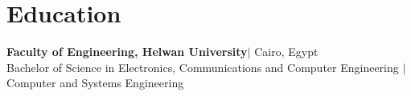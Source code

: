 \section{Education}
  \begin{itemize}[leftmargin=0.15in, label={}]
    {\item{
      \textbf{Faculty of Engineering, Helwan University}{$|$ Cairo, Egypt} \\
      Bachelor of Science in Electronics, Communications and Computer Engineering $|$ Computer and Systems Engineering
    }}
  \end{itemize}
